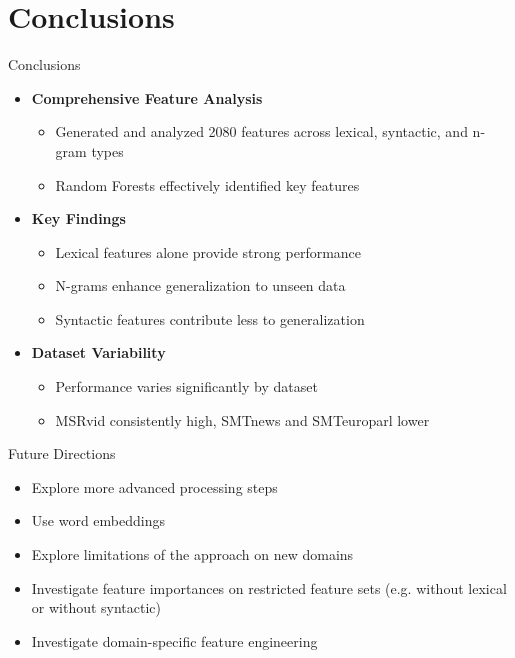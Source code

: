\documentclass{beamer}
\begin{document}
\section{Conclusions}
\begin{frame}{Conclusions}
    \begin{itemize}
        \item \textbf{Comprehensive Feature Analysis}
        \begin{itemize}
            \item Generated and analyzed 2080 features across lexical, syntactic, and n-gram types
            \item Random Forests effectively identified key features
        \end{itemize}
        \item \textbf{Key Findings}
        \begin{itemize}
            \item Lexical features alone provide strong performance
            \item N-grams enhance generalization to unseen data
            \item Syntactic features contribute less to generalization
        \end{itemize}
        \item \textbf{Dataset Variability}
        \begin{itemize}
            \item Performance varies significantly by dataset
            \item MSRvid consistently high, SMTnews and SMTeuroparl lower
        \end{itemize}
    \end{itemize}
\end{frame}

\begin{frame}{Future Directions}
    \begin{itemize}
        \item Explore more advanced processing steps
        \item Use word embeddings
        \item Explore limitations of the approach on new domains
        \item Investigate feature importances on restricted feature sets (e.g. without lexical or without syntactic)
        \item Investigate domain-specific feature engineering
    \end{itemize}
\end{frame}
\end{document}
